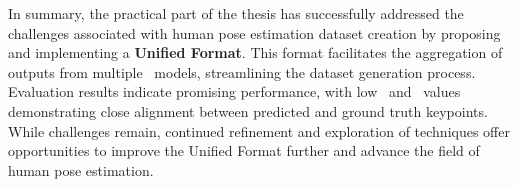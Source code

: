 In summary, the practical part of the thesis has successfully addressed the challenges associated with human pose estimation dataset creation by proposing and implementing a {\bf Unified Format}. This format facilitates the aggregation of outputs from multiple \NN\ models, streamlining the dataset generation process. Evaluation results indicate promising performance, with low \APE\ and \MSE\ values demonstrating close alignment between predicted and ground truth keypoints. While challenges remain, continued refinement and exploration of techniques offer opportunities to improve the Unified Format further and advance the field of human pose estimation.